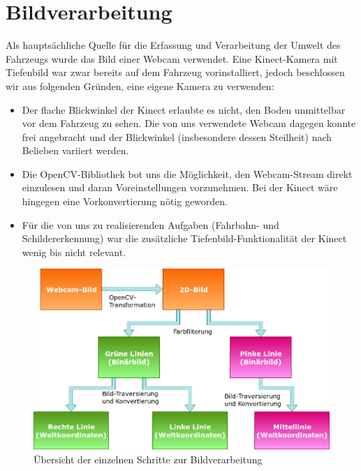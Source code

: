 \section{Bildverarbeitung}\label{sec:linien}

Als haupts\"achliche Quelle f\"ur die Erfassung und Verarbeitung der Umwelt des Fahrzeugs wurde das Bild
einer Webcam verwendet. Eine Kinect-Kamera mit Tiefenbild war zwar bereits auf dem Fahrzeug vorinstalliert,
jedoch beschlossen wir aus folgenden Gr\"unden, eine eigene Kamera zu verwenden:
\begin{itemize}
	\item Der flache Blickwinkel der Kinect erlaubte es nicht, den Boden unmittelbar vor dem Fahrzeug
	zu sehen. Die von uns verwendete Webcam dagegen konnte frei angebracht und der Blickwinkel
	(insbesondere dessen Steilheit) nach Belieben variiert werden.
	\item Die OpenCV-Bibliothek bot uns die M\"oglichkeit, den Webcam-Stream direkt einzulesen und
	daran Voreinstellungen vorzunehmen. Bei der Kinect w\"are hingegen eine Vorkonvertierung n\"otig
	geworden.
	\item F\"ur die von uns zu realisierenden Aufgaben (Fahrbahn- und Schildererkennung) war die
	zus\"atzliche Tiefenbild-Funktionalit\"at der Kinect wenig bis nicht relevant.
\end{itemize}

\begin{figure}[h]
	\centering
	\includegraphics[width = 1.0\textwidth]{images/Bildverarbeitung.png}
	\caption{\"Ubersicht der einzelnen Schritte zur Bildverarbeitung}
	\label{fig:bildverarbeitung}
\end{figure}

